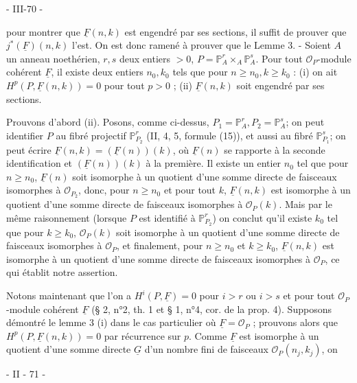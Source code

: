 \newpage


- III-70 -

pour montrer que $\underline{F}(n,k)$ est engendré par ses sections, il suffit de prouver que $j^*(\underline{F})(n,k)$ l'est. On est donc ramené à prouver que le Lemme 3. - Soient $A$ un anneau noethérien, $r, s$ deux entiers $>0$, $P=\mathbb{P}^r_A \times_A \mathbb{P}^s_A$. Pour tout $\mathcal{O}_P$-module cohérent $\underline{F}$, il existe deux entiers $n_0, k_0$ tels que pour $n \ge n_0, k \ge k_0$ :
(i) on ait $H^p(P, \underline{F}(n,k))=0$ pour tout $p>0$ ;
(ii) $\underline{F}(n,k)$ soit engendré par ses sections.

Prouvons d'abord (ii). Posons, comme ci-dessus, $P_1=\mathbb{P}^r_A, P_2=\mathbb{P}^s_A$; on peut identifier $P$ au fibré projectif $\mathbb{P}^r_{P_2}$ (II, 4, 5, formule (15)), et aussi au fibré $\mathbb{P}^s_{P_1}$; on peut écrire $\underline{F}(n,k)=(\underline{F}(n))(k)$, où $\underline{F}(n)$ se rapporte à la seconde identification et $(\underline{F}(n))(k)$ à la première. Il existe un entier $n_0$ tel que pour $n \ge n_0$, $\underline{F}(n)$ soit isomorphe à un quotient d'une somme directe de faisceaux isomorphes à $\mathcal{O}_{P_2}$, donc, pour $n \ge n_0$ et pour tout $k$, $\underline{F}(n,k)$ est isomorphe à un quotient d'une somme directe de faisceaux isomorphes à $\mathcal{O}_P(k)$. Mais par le même raisonnement (lorsque $P$ est identifié à $\mathbb{P}^r_{P_2}$) on conclut qu'il existe $k_0$ tel que pour $k \ge k_0$, $\mathcal{O}_P(k)$ soit isomorphe à un quotient d'une somme directe de faisceaux isomorphes à $\mathcal{O}_P$, et finalement, pour $n \ge n_0$ et $k \ge k_0$, $\underline{F}(n,k)$ est isomorphe à un quotient d'une somme directe de faisceaux isomorphes à $\mathcal{O}_P$, ce qui établit notre assertion.

Notons maintenant que l'on a $H^i(P, \underline{F})=0$ pour $i>r$ ou $i>s$ et pour tout $\mathcal{O}_P$-module cohérent $\underline{F}$ (§ 2, n°2, th. 1 et § 1, n°4, cor. de la prop. 4).
Supposons démontré le lemme 3 (i) dans le cas particulier où $\underline{F}=\mathcal{O}_P$ ; prouvons alors que $H^p(P, \underline{F}(n,k))=0$ par récurrence sur $p$. Comme $\underline{F}$ est isomorphe à un quotient d'une somme directe $\underline{G}$ d'un nombre fini de faisceaux $\mathcal{O}_P(n_j, k_j)$, on

\newpage


- II - 71 -

